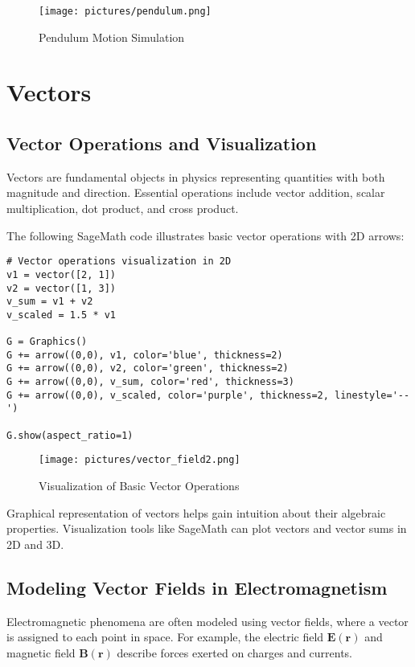 \documentclass[12pt]{book}
\begin{document}
\begin{figure}[H]
  \centering
  \texttt{[image: pictures/pendulum.png]}
  \caption{Pendulum Motion Simulation}
  \label{fig:pendulum}
\end{figure}


\chapter{Vectors}

\section{Vector Operations and Visualization}

Vectors are fundamental objects in physics representing quantities with both magnitude and direction. Essential operations include vector addition, scalar multiplication, dot product, and cross product.

The following SageMath code illustrates basic vector operations with 2D arrows:

\begin{verbatim}
# Vector operations visualization in 2D
v1 = vector([2, 1])
v2 = vector([1, 3])
v_sum = v1 + v2
v_scaled = 1.5 * v1

G = Graphics()
G += arrow((0,0), v1, color='blue', thickness=2)
G += arrow((0,0), v2, color='green', thickness=2)
G += arrow((0,0), v_sum, color='red', thickness=3)
G += arrow((0,0), v_scaled, color='purple', thickness=2, linestyle='--')

G.show(aspect_ratio=1)
\end{verbatim}

\begin{figure}[H]
  \centering
  \texttt{[image: pictures/vector\_field2.png]}
  \caption{Visualization of Basic Vector Operations}
  \label{fig:vector_operations}
\end{figure}

Graphical representation of vectors helps gain intuition about their algebraic properties. Visualization tools like SageMath can plot vectors and vector sums in 2D and 3D.

\section{Modeling Vector Fields in Electromagnetism}

Electromagnetic phenomena are often modeled using vector fields, where a vector is assigned to each point in space. For example, the electric field \(\mathbf{E}(\mathbf{r})\) and magnetic field \(\mathbf{B}(\mathbf{r})\) describe forces exerted on charges and currents.
\end{document}
